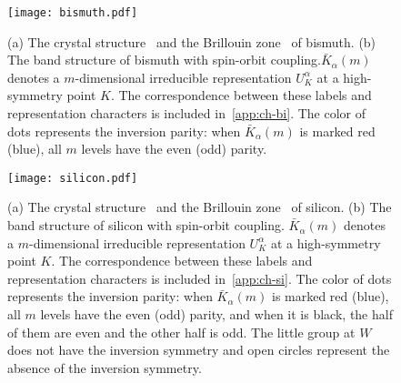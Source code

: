 \documentclass[3p,preprint]{elsarticle}
\newcommand{\mZ}{\mathbb{Z}}
\begin{document}

\begin{figure}[H]
	\begin{center}
		\texttt{[image: bismuth.pdf]}
		\caption{\label{fig:bismuth}
(a) The crystal structure~\cite{mp} and the Brillouin zone~\cite{seekpath1,seekpath2} of bismuth. (b) The band structure of bismuth with spin-orbit coupling.\protect \footnotemark $\bar{K}_{\alpha}(m)$ denotes a $m$-dimensional irreducible representation $U_{K}^{\alpha}$ at a high-symmetry point $K$. The correspondence between these labels and representation characters is included in~\ref{app:ch-bi}. The color of dots represents the inversion parity: when $\bar{K}_{\alpha}(m)$ is marked red (blue), all $m$ levels have the even (odd) parity.
}
	\end{center}
\end{figure}


\begin{figure}[H]
	\begin{center}
		\texttt{[image: silicon.pdf]}
		\caption{\label{fig:silicon}
(a) The crystal structure~\cite{mp} and the Brillouin zone~\cite{seekpath1,seekpath2} of silicon. (b) The band structure of silicon with spin-orbit coupling. $\bar{K}_{\alpha}(m)$ denotes a $m$-dimensional irreducible representation $U_{K}^{\alpha}$ at a high-symmetry point $K$. The correspondence between these labels and representation characters is included in~\ref{app:ch-si}. The color of dots represents the inversion parity: when $\bar{K}_{\alpha}(m)$ is marked red (blue), all $m$ levels have the even (odd) parity, and when it is black, the half of them are even and the other half is odd. The little group at $W$ does not have the inversion symmetry and open circles represent the absence of the inversion symmetry.}
	\end{center}
\end{figure}
\end{document}

